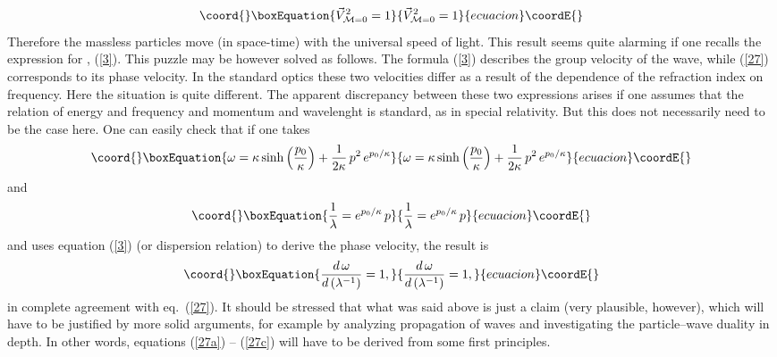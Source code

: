 \documentclass[a4paper,a4paper]{article}
\begin{document}
\begin{equation}\coord{}\boxEquation{\label{27}
 \vec{V}_{{\cal M}=0}^2 =1
}{\vec{V}_{{\cal M}=0}^2 =1
}{ecuacion}\coordE{}\end{equation}
 Therefore the massless particles move (in space-time) with the universal speed of light. This result seems quite alarming if one recalls the expression for \coordHE{}, (\ref{3}). This puzzle may be however solved as follows. The formula (\ref{3}) describes the group velocity of the wave, while (\ref{27}) corresponds to its phase velocity. In the standard optics these two velocities differ as a result of the dependence of the refraction index on frequency. Here the situation is quite different. The apparent discrepancy between these two expressions arises if one assumes that the relation of energy \coordHE{} and frequency \myHighlight{$\omega$}\coordHE{} and momentum \coordHE{} and wavelenght \myHighlight{$\lambda$}\coordHE{} is standard, as in special relativity. But this does not necessarily need to be  the case here. One can easily check that if one takes
\begin{equation}\coord{}\boxEquation{\label{27a}
  \omega = \kappa\sinh\left(\frac{p_0}\kappa\right) + \frac{1}{2\kappa}\, p^2 \, e^{p_0/\kappa}
}{\omega = \kappa\sinh\left(\frac{p_0}\kappa\right) + \frac{1}{2\kappa}\, p^2 \, e^{p_0/\kappa}
}{ecuacion}\coordE{}\end{equation}
and
\begin{equation}\coord{}\boxEquation{\label{27b}
 \frac1\lambda = e^{p_0/\kappa}\, p
}{\frac1\lambda = e^{p_0/\kappa}\, p
}{ecuacion}\coordE{}\end{equation}
and uses equation (\ref{3}) (or dispersion relation) to derive the phase velocity, the result is
\begin{equation}\coord{}\boxEquation{\label{27c}
  \frac{d\, \omega}{d\, (\lambda^{-1})} =1,
}{\frac{d\, \omega}{d\, (\lambda^{-1})} =1,
}{ecuacion}\coordE{}\end{equation}
in complete agreement with eq.~(\ref{27}). It should be stressed  that what was said above is just a  claim (very plausible, however), which will have to be justified by more solid arguments, for example by analyzing propagation of waves and investigating the particle--wave duality in depth. In other words, equations (\ref{27a}) -- (\ref{27c}) will have to be derived from some first principles.
 \newline
 
\end{document}
